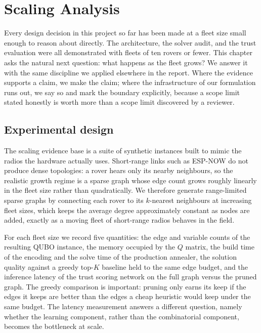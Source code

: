 \section{Scaling Analysis}
\label{ch:scaling}

Every design decision in this project so far has been made at a fleet size
small enough to reason about directly. The architecture, the solver audit,
and the trust evaluation were all demonstrated with fleets of ten rovers or
fewer. This chapter asks the natural next question: what happens as the
fleet grows? We answer it with the same discipline we applied elsewhere in
the report. Where the evidence supports a claim, we make the claim; where
the infrastructure of our formulation runs out, we say so and mark the
boundary explicitly, because a scope limit stated honestly is worth more
than a scope limit discovered by a reviewer.

\subsection{Experimental design}
\label{sec:scaling-design}

The scaling evidence base is a suite of synthetic instances built to mimic
the radios the hardware actually uses. Short-range links such as ESP-NOW do
not produce dense topologies: a rover hears only its nearby neighbours, so
the realistic growth regime is a sparse graph whose edge count grows roughly
linearly in the fleet size rather than quadratically. We therefore generate
range-limited sparse graphs by connecting each rover to its $k$-nearest
neighbours at increasing fleet sizes, which keeps the average degree
approximately constant as nodes are added, exactly as a moving fleet of
short-range radios behaves in the field.

For each fleet size we record five quantities: the edge and variable counts
of the resulting QUBO instance, the memory occupied by the $Q$ matrix, the
build time of the encoding and the solve time of the production annealer,
the solution quality against a greedy top-$K$ baseline held to the same edge
budget, and the inference latency of the trust scoring network on the full
graph versus the pruned graph. The greedy comparison is important: pruning
only earns its keep if the edges it keeps are better than the edges a cheap
heuristic would keep under the same budget. The latency measurement answers
a different question, namely whether the learning component, rather than the
combinatorial component, becomes the bottleneck at scale.

